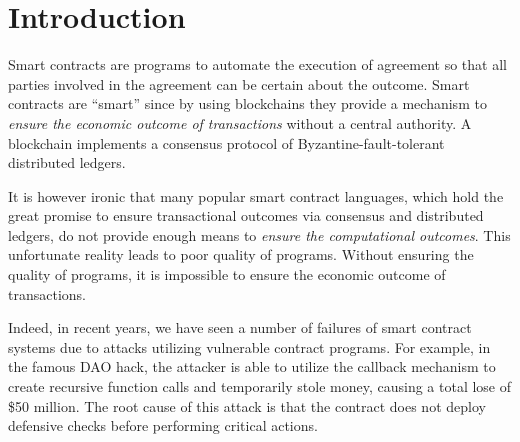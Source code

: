 \section{Introduction}
\label{sec:intro}





Smart contracts are programs to automate the execution of agreement so that all
parties involved in the agreement can be certain about the outcome.
Smart contracts are ``smart'' since by using blockchains they provide a
mechanism to \emph{ensure the economic outcome of transactions} without a
central authority.
A blockchain implements a consensus protocol of Byzantine-fault-tolerant
distributed ledgers.

It is however ironic that many popular smart contract languages, which hold the
great promise to ensure transactional outcomes via consensus and distributed
ledgers, do not provide enough means to \emph{ensure the computational outcomes}.
This unfortunate reality leads to poor quality of programs.
Without ensuring the quality of programs, it is impossible to ensure the
economic outcome of transactions.

Indeed, in recent years, we have seen a number of failures of smart contract
systems due to attacks utilizing vulnerable contract programs.
For example, in the famous DAO hack, the attacker is able to utilize the
callback mechanism to create recursive function calls and temporarily stole
money, causing a total lose of \$50 million.
The root cause of this attack is that the contract does not deploy defensive
checks before performing critical actions.

